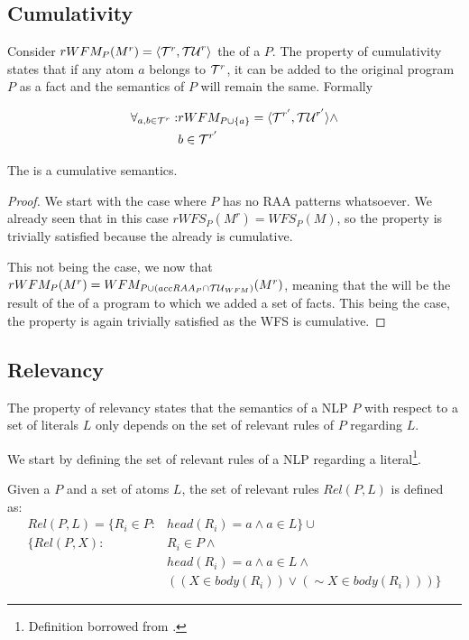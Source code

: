 \subsection{Cumulativity}
Consider $rWFM_{P}(M^{r})=\langle{\cal{T}}^{r},{\cal{TU}}^{r}\rangle$ the \rwfm of a \nlp $P$. The property of cumulativity states that if any atom $a$ belongs to ${\cal{T}}^{r}$, it can be added to the original program $P$ as a fact and the semantics of $P$ will remain the same. Formally

\begin{align*}
\forall_{a,b\in{\cal{T}}^{r}}: & rWFM_{P\cup\{a\}}=\langle{\cal{T}}^{r'},{\cal{TU}}^{r'}\rangle \wedge\\
															 & b \in {\cal{T}}^{r'}
\end{align*}

\begin{theorem}
\label{th:cumulativity}
The \rwfs is a cumulative semantics.

\begin{proof}
We start with the case where $P$ has no RAA patterns whatsoever. We already seen that in this case $rWFS_{P}(M^{r})=WFS_{P}(M)$, so the property is trivially satisfied because the \WFS already is cumulative.

This not being the case, we now that $rWFM_{P}(M^{r})=WFM_{P\cup \left(accRAA_{P}\cap {\cal{TU}}_{WFM}\right)}(M^{r})$, meaning that the \rwfs will be the result of the \wfs of a program to which we added a set of facts. This being the case, the property is again trivially satisfied as the WFS is cumulative.
\end{proof}
\end{theorem}


\subsection{Relevancy}
The property of relevancy states that the semantics of a NLP $P$ with respect to a set of literals $L$ only depends on the set of relevant rules of $P$ regarding $L$.

We start by defining the set of relevant rules of a NLP regarding a literal\footnote{Definition borrowed from \cite{ampMSc}.}.

\begin{definition}
Given a \nlp $P$ and a set of atoms $L$, the set of relevant rules $Rel(P,L)$ is defined as:
\begin{align*}
Rel(P,L) =  \{R_{i}\in P: & head(R_{i}) = a \wedge a\in L\} \cup\\
            \{Rel(P,X):   & R_{i}\in P\wedge\\
                          & head(R_{i})= a \wedge a\in L \wedge\\
                          & \left(\left(X\in body(R_{i})\right)\vee \left(\sim X\in body(R_{i})\right)\right)\}
\end{align*}

\end{definition}

